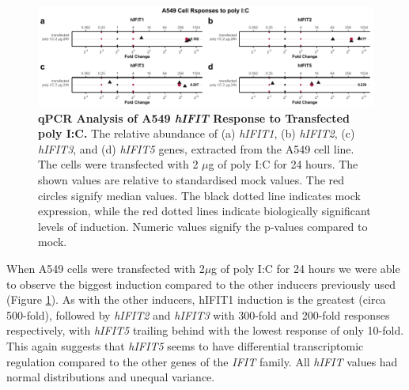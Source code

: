\begin{figure}
    \centering
    \includegraphics[width=1\linewidth]{06. Chapter 1/Figs/01. Induction/04. a549_treat_polyic.pdf}
    \caption[qPCR Analysis of A549 \textit{hIFIT} Response to Transfected poly I:C.]{\textbf{qPCR Analysis of A549 \textit{hIFIT} Response to Transfected poly I:C.} The relative abundance of (a) \textit{hIFIT1}, (b) \textit{hIFIT2}, (c) \textit{hIFIT3}, and (d) \textit{hIFIT5} genes, extracted from the A549 cell line. The cells were transfected with 2 \(\mu\)g of poly I:C for 24 hours. The shown values are relative to standardised mock values. The red circles signify median values. The black dotted line indicates mock expression, while the red dotted lines indicate biologically significant levels of induction. Numeric values signify the p-values compared to mock.}
    \label{fig:A549 Response to poly I:C}
\end{figure}

When A549 cells were transfected with 2\(\mu\)g of poly I:C for 24 hours we were able to observe the biggest induction compared to the other inducers previously used (Figure \ref{fig:A549 Response to poly I:C}). As with the other inducers, hIFIT1 induction is the greatest (circa 500-fold), followed by \textit{hIFIT2} and \textit{hIFIT3} with 300-fold and 200-fold responses respectively, with \textit{hIFIT5} trailing behind with the lowest response of only 10-fold. This again suggests that \textit{hIFIT5} seems to have differential transcriptomic regulation compared to the other genes of the \textit{IFIT} family. All \textit{hIFIT} values had normal distributions and unequal variance.

